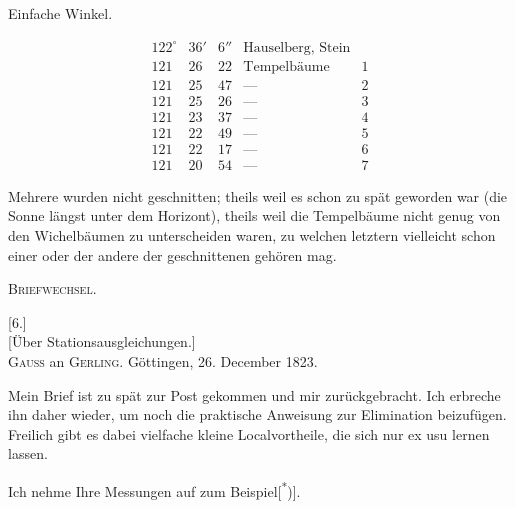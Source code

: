 \medskip
\noindent\begin{minipage}[t]{.43\textwidth}
\begin{center}Einfache Winkel.\end{center}
\[
\begin{array}{rrrlr}
122^\circ&36'&6''&\text{Hauselberg, Stein}&\\
121&26&22&\text{Tempelbäume}&1\\
121&25&47&\text{---}&2\\
121&25&26&\text{---}&3\\
121&23&37&\text{---}&4\\
121&22&49&\text{---}&5\\
121&22&17&\text{---}&6\\
121&20&54&\text{---}&7
\end{array}
\]
\end{minipage}\hfill
\begin{minipage}[t]{.54\textwidth}
\vspace{2.7\baselineskip}
Mehrere wurden nicht geschnitten; theils weil es schon zu spät geworden war (die Sonne längst unter dem Horizont), theils weil die Tempelbäume nicht genug von den Wichelbäumen zu unterscheiden waren, zu welchen letztern vielleicht schon einer oder der andere der geschnittenen gehören mag.
\end{minipage}

\clearpage
{}\hfill\textsc{Briefwechsel.}\hfill\mbox{}\par\bigskip
\begin{center}
[6.]\\[7pt]
[Über Stationsausgleichungen.]\\[14pt]
\textsc{Gauss} an \textsc{Gerling}. Göttingen, 26. December 1823.
\end{center}
Mein Brief ist zu spät zur Post gekommen und mir zurückgebracht. Ich erbreche ihn daher wieder, um noch die praktische Anweisung zur Elimination beizufügen. Freilich gibt es dabei vielfache kleine Localvortheile, die sich nur ex usu lernen lassen.

Ich nehme Ihre Messungen auf  zum Beispiel[\textsuperscript{*})].

